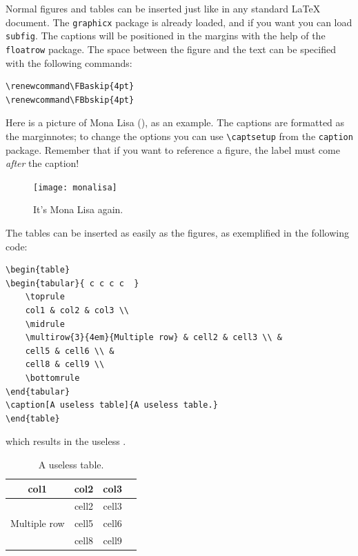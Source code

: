 Normal figures and tables can be inserted just like in any standard 
\LaTeX\xspace document. The \verb|graphicx| package is already loaded, 
and if you want you can load \verb|subfig|. The captions will be 
positioned in the margins with the help of the \verb|floatrow| package. 
The space between the figure and the text can be specified with the 
following commands:

\begin{lstlisting}[style=kaolstplain]
\renewcommand\FBaskip{4pt}
\renewcommand\FBbskip{4pt}
\end{lstlisting}

Here is a picture of Mona Lisa (), as an example. 
The captions are formatted as the marginnotes; to change the options you 
can use \verb|\captsetup| from the \verb|caption| package. Remember that 
if you want to reference a figure, the label must come \emph{after} the 
caption!

\begin{figure}[h]
	\texttt{[image: monalisa]}
	\caption[Mona Lisa, again]{It's Mona Lisa again. \blindtext}
\end{figure}

The tables can be inserted as easily as the figures, as exemplified in 
the following code:

\begin{lstlisting}
\begin{table}
\begin{tabular}{ c c c c  }
	\toprule
	col1 & col2 & col3 \\
	\midrule
	\multirow{3}{4em}{Multiple row} & cell2 & cell3 \\ &
	cell5 & cell6 \\ &
	cell8 & cell9 \\
	\bottomrule
\end{tabular}
\caption[A useless table]{A useless table.}
\end{table}
\end{lstlisting}

which results in the useless .

\begin{table}[h]
\begin{tabular}{ c c c c  }
	\toprule
	col1 & col2 & col3 \\
	\midrule
	\multirow{3}{4em}{Multiple row} & cell2 & cell3 \\ &
	cell5 & cell6 \\ &
	cell8 & cell9 \\
	\bottomrule
\end{tabular}
\caption[A useless table]{A useless table.}
\end{table}

